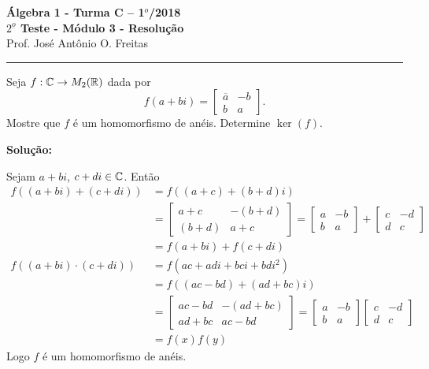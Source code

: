 \documentclass[12pt]{article}
\begin{document}


\begin{center}
{\Large\bf {\'A}lgebra 1 - Turma C -- 1$^{o}$/2018} \\ \vspace{9pt} {\large\bf
  $2^{\underline{o}}$ Teste - Módulo 3 - Resolu\c{c}\~ao}\\
\vspace{9pt} Prof. Jos{\'e} Ant{\^o}nio O. Freitas
\end{center}
\hrule

\vspace{.6cm}

\questao Seja $f : \mathbb{C} \to M_2(\mathbb{R})$ dada por
\[
	f(a + bi) = \begin{bmatrix}
		\overline{a} & -b\\
		b & a
	\end{bmatrix}.
\]
Mostre que $f$ é um homomorfismo de anéis. Determine $\ker(f)$.

\noindent\textbf{Solu\c{c}\~ao:}

Sejam $a + bi$, $c + di \in \mathbb{C}$. Então
\begin{align*}
	f((a + bi) + (c + di)) &= f((a + c) + (b + d)i) \\&= \begin{bmatrix}
		a + c & -(b + d)\\
		(b + d) & a + c
	\end{bmatrix} = \begin{bmatrix}
		a & -b\\
		b & a
	\end{bmatrix} + \begin{bmatrix}
		c & -d\\
		d & c
	\end{bmatrix}\\ &= f(a + bi) + f(c + di)\\
	f((a + bi)\cdot (c + di)) &= f(ac + adi + bci + bdi^2) \\ &= f((ac - bd) + (ad + bc)i) \\ &= \begin{bmatrix}
		ac - bd & -(ad + bc)\\
		ad + bc & ac - bd
	\end{bmatrix} = \begin{bmatrix}
		a & -b\\
		b & a
	\end{bmatrix} \begin{bmatrix}
		c & -d\\
		d & c
	\end{bmatrix}\\ &= f(x)f(y)
\end{align*}
Logo $f$ é um homomorfismo de anéis.
\end{document}
